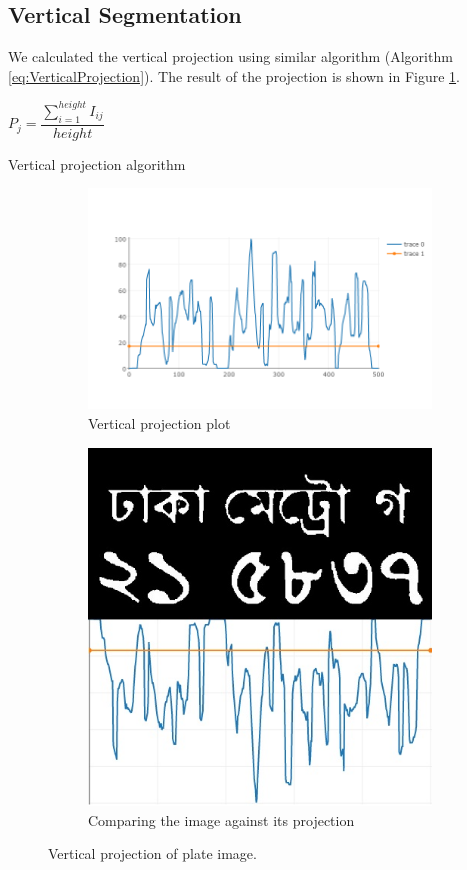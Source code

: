 \documentclass{standalone}
\begin{document}
\subsection{Vertical Segmentation}
We calculated the vertical projection using similar algorithm (Algorithm \ref{eq:VerticalProjection}). The result of the projection is shown in Figure \ref{fig:VerticalProjection}.

\begin{algorithm}
  \begin{algorithmic}
        \State $P_j = \dfrac{ \sum^{height}_{i=1}{ I_{ij} } }{ height }$
    \EndFor
  \end{algorithmic}
  \caption{Vertical projection algorithm}
  \label{eq:VerticalProjection}
\end{algorithm}

\begin{figure}
\centering
\begin{subfigure}{0.8\textwidth}
  \centering
  \includegraphics[width=0.8\linewidth]{./img/plots/vertical-1}
  \caption{Vertical projection plot}
\end{subfigure}
\begin{subfigure}{0.8\textwidth}
  \centering
  \includegraphics[width=0.8\linewidth]{./img/plots/vertical-2}
  \caption{Comparing the image against its projection}
\end{subfigure}
\caption{Vertical projection of plate image.}
\label{fig:VerticalProjection}
\end{figure}
\end{document}
